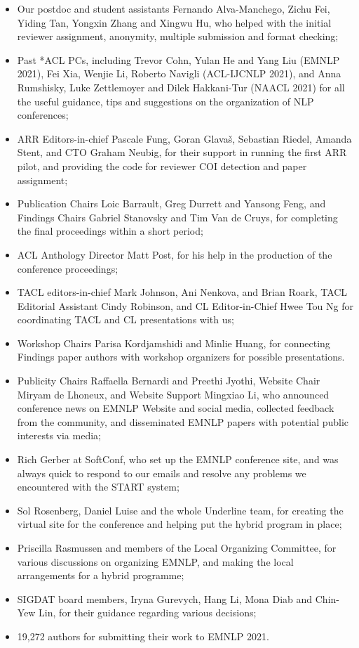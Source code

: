 \begin{itemize}
\item Our postdoc and student assistants Fernando Alva-Manchego, Zichu Fei, Yiding Tan, Yongxin Zhang and Xingwu Hu, who helped with the initial reviewer assignment, anonymity, multiple submission and format checking;
\item Past *ACL PCs, including Trevor Cohn, Yulan He and Yang Liu (EMNLP 2021), Fei Xia, Wenjie Li, Roberto Navigli (ACL-IJCNLP 2021), and Anna Rumshisky, Luke Zettlemoyer and Dilek Hakkani-Tur (NAACL 2021) for all the useful guidance, tips and suggestions on the organization of NLP conferences;
\item ARR Editors-in-chief Pascale Fung, Goran Glavaš, Sebastian Riedel, Amanda Stent, and CTO Graham Neubig, for their support in running the first ARR pilot, and providing the code for reviewer COI detection and paper assignment;
\item Publication Chairs Loic Barrault, Greg Durrett and Yansong Feng, and Findings Chairs Gabriel Stanovsky and Tim Van de Cruys, for completing the final proceedings within a short period;
\item ACL Anthology Director Matt Post, for his help in the production of the conference proceedings;
\item TACL editors-in-chief Mark Johnson, Ani Nenkova, and Brian Roark, TACL Editorial Assistant Cindy Robinson, and CL Editor-in-Chief Hwee Tou Ng for coordinating TACL and CL presentations with us;
\item Workshop Chairs Parisa Kordjamshidi and Minlie Huang, for connecting Findings paper authors with workshop organizers for possible presentations.
\item Publicity Chairs Raffaella Bernardi and Preethi Jyothi, Website Chair Miryam de Lhoneux, and Website Support Mingxiao Li, who announced conference news on EMNLP Website and social media, collected feedback from the community, and disseminated EMNLP papers with potential public interests via media;
\item Rich Gerber at SoftConf, who set up the EMNLP conference site, and was always quick to respond to our emails and resolve any problems we encountered with the START system;
\item Sol Rosenberg, Daniel Luise and the whole Underline team, for creating the virtual site for the conference and helping put the hybrid program in place;
\item Priscilla Rasmussen and members of the Local Organizing Committee, for various discussions on organizing EMNLP, and making the local arrangements for a hybrid programme;
\item SIGDAT board members, Iryna Gurevych, Hang Li, Mona Diab and Chin-Yew Lin, for their guidance regarding various decisions;
\item 19,272 authors for submitting their work to EMNLP 2021.

\end{itemize}

